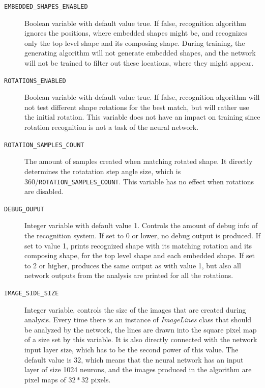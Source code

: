 \begin{description}
\begin{description}
\begin{description}
\item[\texttt{EMBEDDED\_SHAPES\_ENABLED}] Boolean variable with default value true. If false, recognition algorithm ignores the positions, where embedded shapes might be, and recognizes only the top level shape and its composing shape. During training, the generating algorithm will not generate embedded shapes, and the network will not be trained to filter out these locations, where they might appear.

\item[\texttt{ROTATIONS\_ENABLED}] Boolean variable with default value true. If false, recognition algorithm will not test different shape rotations for the best match, but will rather use the initial rotation. This variable does not have an impact on training since rotation recognition is not a task of the neural network.

\item[\texttt{ROTATION\_SAMPLES\_COUNT}] The amount of samples created when matching rotated shape. It directly determines the rotatation step angle size, which is 360/\texttt{ROTATION\_SAMPLES\_COUNT}. This variable has no effect when rotations are disabled.

\item[\texttt{DEBUG\_OUPUT}] Integer variable with default value 1. Controls the amount of debug info of the recognition system. If set to 0 or lower, no debug output is produced. If set to value 1, prints recognized shape with its matching rotation and its composing shape, for the top level shape and each embedded shape. If set to 2 or higher, produces the same output as with value 1, but also all network outputs from the analysis are printed for all the rotations.

\item[\texttt{IMAGE\_SIDE\_SIZE}] Integer variable, controls the size of the images that are created during analysis. Every time there is an instance of \emph{ImageLines} class that should be analyzed by the network, the lines are drawn into the square pixel map of a size set by this variable. It is also directly connected with the network input layer size, which has to be the second power of this value. The default value is 32, which means that the neural network has an input layer of size 1024 neurons, and the images produced in the algorithm are pixel maps of $32*32$ pixels.

\end{description}


\end{description}
\end{description}
